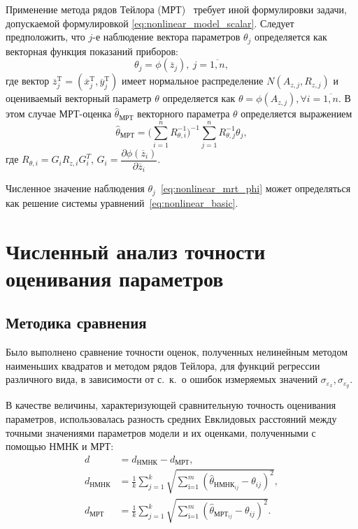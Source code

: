 Применение метода рядов Тейлора (МРТ)~\cite{mukha_2000}
требует иной формулировки задачи, допускаемой формулировкой \eqref{eq:nonlinear_model_scalar}.
Следует предположить, что \( j \)-е наблюдение вектора параметров \( \theta_j \)
определяется как векторная функция показаний приборов:
\begin{equation}
  \label{eq:nonlinear_mrt_phi}
  \theta_j = \phi( \overline{z}_{j} ), \: j = \overline{1, n},
\end{equation}
где вектор
\( \overline{z}^{\text{T}}_{j} =
( \overline{x}^{\text{T}}_{j}, \overline{y}^{\text{T}}_{j}) \)
имеет нормальное распределение \( N(A_{z,j}, R_{z,j}) \)
и оцениваемый векторный параметр \( \theta \) определяется как
\( \theta = \phi(A_{z,j}), \forall i = \overline{1, n} \).
В этом случае МРТ-оценка \( \hat{\theta}_{\text{МРТ}} \) векторного параметра \( \theta \)
определяется выражением
\begin{equation}
  \label{eq:nonlinear_mrt}
  \hat{\theta}_{\text{МРТ}} =
  \Bigg( \sum^{n}_{i=1} R^{-1}_{\theta,i} \Bigg)^{-1}
  \sum^{n}_{j=1} R^{-1}_{\theta,j} \theta_j,
\end{equation}
где
\( R_{\theta,i} = G_i R_{z,i} G^T_i \),
\( G_i =
\dfrac{\partial \phi( \overline{z}_{i} ) }{ \partial \overline{z}_{i} } \).

Численное значение наблюдения \( \theta_j \)~\eqref{eq:nonlinear_mrt_phi} может определяться как
решение системы уравнений~\eqref{eq:nonlinear_basic}.


\section{Численный анализ точности оценивания параметров}

\subsection{Методика сравнения}

Было выполнено сравнение точности оценок,
полученных нелинейным методом наименьших квадратов и методом рядов Тейлора,
для функций регрессии различного вида,
в зависимости от с.~к.~о ошибок измеряемых значений
\( \sigma_{\varepsilon_x}, \sigma_{\varepsilon_y} \).

В качестве величины, характеризующей сравнительную точность оценивания параметров,
использовалась разность средних Евклидовых расстояний
между точными значениями параметров модели и их оценками, полученными
с помощью НМНК и МРТ:
\begin{equation}
  \begin{aligned}
    d &= d_{\text{НМНК}} - d_{\text{МРТ}}, \\
    d_{\text{НМНК}} &=
    \frac{1}{k} \sum_{j=1}^k
    \sqrt{\sum_{\text{i=1}}^m (\hat{\theta}_{\text{НМНК}_{ij}} - \theta_{ij})^2}, \\
    d_{\text{МРТ}} &=
    \frac{1}{k} \sum_{j=1}^k
    \sqrt{\sum_{\text{i=1}}^m (\hat{\theta}_{\text{МРТ}_{ij}} - \theta_{ij})^2}.
  \end{aligned}
  \label{eq:dst_nonlinear_param}
\end{equation}

